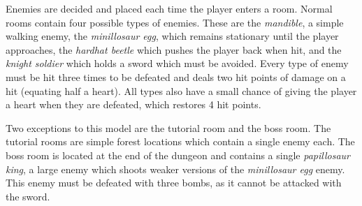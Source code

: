 \documentclass[a4paper]{article}
\begin{document}
\begin{multicols*}{2}
Enemies are decided and placed each time the player enters a room. Normal rooms contain four possible types of enemies. These are the \emph{mandible}, a simple walking enemy, the \emph{minillosaur egg}, which remains stationary until the player approaches, the \emph{hardhat beetle} which pushes the player back when hit, and the \emph{knight soldier} which holds a sword which must be avoided. Every type of enemy must be hit three times to be defeated and deals two hit points of damage on a hit (equating half a heart). All types also have a small chance of giving the player a heart when they are defeated, which restores 4 hit points.

Two exceptions to this model are the tutorial room and the boss room. The tutorial rooms are simple forest locations which contain a single enemy each. The boss room is located at the end of the dungeon and contains a single \emph{papillosaur king}, a large enemy which shoots weaker versions of the \emph{minillosaur egg} enemy. This enemy must be defeated with three bombs, as it cannot be attacked with the sword.


\end{multicols*}
\end{document}
